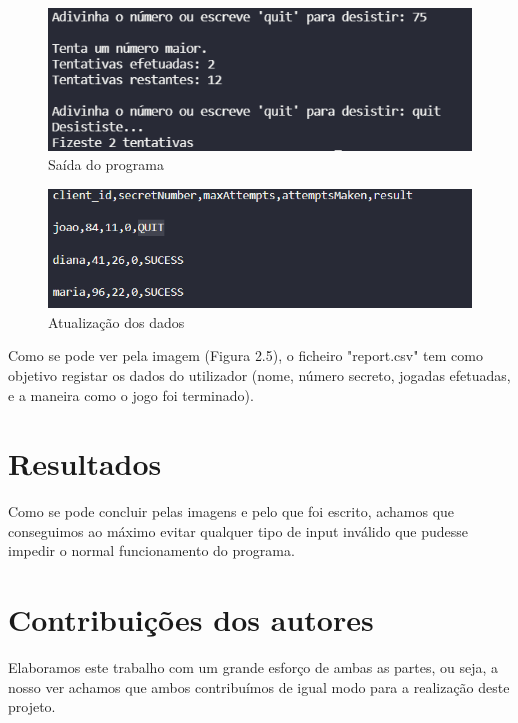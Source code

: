 \documentclass{report}
\begin{document}
\vspace{10mm}
    \begin{figure}[h]
        \begin{center}
            \includegraphics[scale=0.5]{unknown (3).png}
            \caption{Saída do programa}
        \end{center}
    \end{figure}

\vspace{10mm}
    \begin{figure}[h]
        \begin{center}
            \includegraphics[scale=0.5]{unknown (2).png}
            \caption{Atualização dos dados}
        \end{center}
    \end{figure}

Como se pode ver pela imagem (Figura 2.5), o ficheiro "report.csv" tem como objetivo registar os dados do utilizador (nome, número secreto, jogadas efetuadas, e a maneira como o jogo foi terminado).


\chapter{Resultados}
\label{chap.resultados}
Como se pode concluir pelas imagens e pelo que foi escrito, achamos que conseguimos ao máximo evitar qualquer tipo de input inválido que pudesse impedir o normal funcionamento do programa. 

\chapter*{Contribuições dos autores}
Elaboramos este trabalho com um grande esforço de ambas as partes, ou seja, a nosso ver achamos que ambos contribuímos de igual modo para a realização deste projeto.
\end{document}
